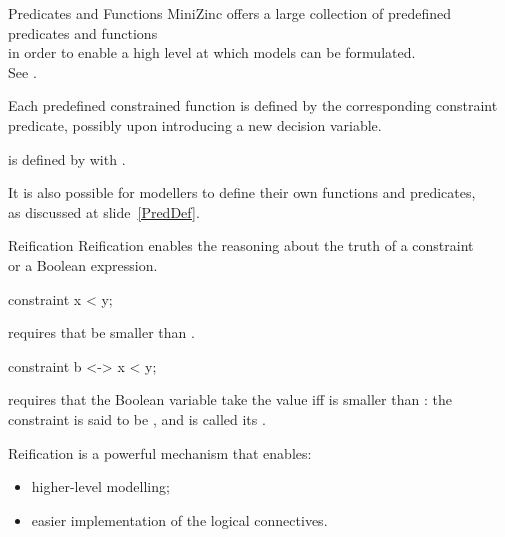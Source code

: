 \documentclass{cons-beamer}
\begin{document}
\begin{flashcardminizinc}
\begin{frame}{Predicates and Functions}
  MiniZinc offers a large collection of predefined predicates and
  functions \\ in order to enable a high level at which models can be
  formulated. \\ See \topicConsPredicates. \vfill

  Each predefined constrained function is defined by the corresponding
  constraint predicate, possibly upon introducing a new decision
  variable.
  \begin{example}
     is defined by 
     with .
  \end{example}\vfill
  It is also possible for modellers to define their own functions and
  predicates, \\ as discussed at slide~\ref{PredDef}.
\end{frame}

\begin{frame}[fragile]{Reification}
  Reification enables the reasoning about the truth of a constraint \\
  or a Boolean expression. \vfill
  \begin{example}
    \begin{mznno}
  constraint x < y;
    \end{mznno}
    requires that  be smaller than . \vfill
    \begin{mznno}
  constraint b <-> x < y;
    \end{mznno}
    requires that the Boolean variable  take the value
     iff  is smaller than :
    the constraint  is said to be ,
    and  is called its .
  \end{example}\vfill

  Reification is a powerful mechanism that enables: \vfill
  \begin{itemize}
  \item higher-level modelling; \vfill
  \item easier implementation of the logical connectives.
  \end{itemize}
\end{frame}


\end{flashcardminizinc}
\end{document}
